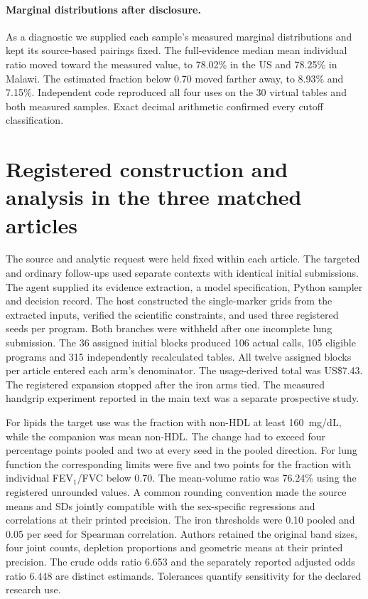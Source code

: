 \paragraph{Marginal distributions after disclosure.}
As a diagnostic we supplied each sample's measured marginal distributions and kept its source-based pairings fixed. The full-evidence median mean individual ratio moved toward the measured value, to 78.02\% in the US and 78.25\% in Malawi. The estimated fraction below 0.70 moved farther away, to 8.93\% and 7.15\%. Independent code reproduced all four uses on the 30 virtual tables and both measured samples. Exact decimal arithmetic confirmed every cutoff classification.
\clearpage

\section{Registered construction and analysis in the three matched articles}
\label{app:matchedprotocol}
The source and analytic request were held fixed within each article. The targeted and ordinary follow-ups used separate contexts with identical initial submissions. The agent supplied its evidence extraction, a model specification, Python sampler and decision record. The host constructed the single-marker grids from the extracted inputs, verified the scientific constraints, and used three registered seeds per program. Both branches were withheld after one incomplete lung submission. The 36 assigned initial blocks produced 106 actual calls, 105 eligible programs and 315 independently recalculated tables. All twelve assigned blocks per article entered each arm's denominator. The usage-derived total was US\$7.43. The registered expansion stopped after the iron arms tied. The measured handgrip experiment reported in the main text was a separate prospective study.

For lipids the target use was the fraction with non-HDL at least 160~mg/dL, while the companion was mean non-HDL. The change had to exceed four percentage points pooled and two at every seed in the pooled direction. For lung function the corresponding limits were five and two points for the fraction with individual FEV$_1$/FVC below 0.70. The mean-volume ratio was 76.24\% using the registered unrounded values. A common rounding convention made the source means and SDs jointly compatible with the sex-specific regressions and correlations at their printed precision. The iron thresholds were 0.10 pooled and 0.05 per seed for Spearman correlation. Authors retained the original band sizes, four joint counts, depletion proportions and geometric means at their printed precision. The crude odds ratio 6.653 and the separately reported adjusted odds ratio 6.448 are distinct estimands. Tolerances quantify sensitivity for the declared research use.


